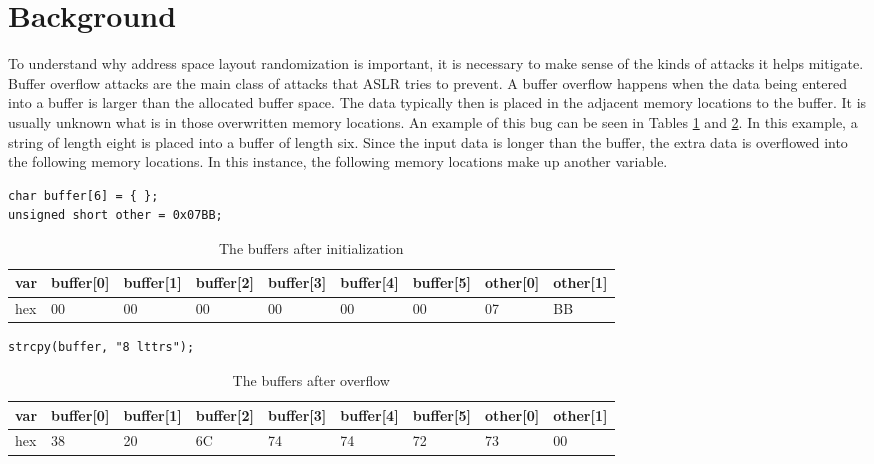 \section{Background}
\label{s:background} %

To understand why address space layout randomization is important, it is necessary to make sense of the kinds of attacks it helps mitigate. Buffer overflow attacks are the main class of attacks that ASLR tries to prevent. A buffer overflow happens when the data being entered into a buffer is larger than the allocated buffer space. The data typically then is placed in the adjacent memory locations to the buffer. It is usually unknown what is in those overwritten memory locations. An example of this bug can be seen in Tables \ref{t:fig1a} and \ref{t:fig1b}. In this example, a string of length eight is placed into a buffer of length six. Since the input data is longer than the buffer, the extra data is overflowed into the following memory locations. In this instance, the following memory locations make up another variable.

\begin{lstlisting}[caption=Code before Table \ref{t:fig1a}]
char buffer[6] = { };
unsigned short other = 0x07BB;
\end{lstlisting}

\begin{table}[h]
\centering %
\begin{tabular}{|l|l|l|l|l|l|l|l|l|}
\hline
\multicolumn{1}{|c|}{var} & buffer{[}0{]} & buffer{[}1{]} & buffer{[}2{]} & buffer{[}3{]} & buffer{[}4{]} & buffer{[}5{]} & other{[}0{]} & other{[}1{]} \\ \hline
hex                       & 00            & 00            & 00            & 00            & 00            & 00            & 07           & BB           \\ \hline
\end{tabular}
\caption{The buffers after initialization}
\label{t:fig1a}
\end{table}

\begin{lstlisting}[caption=Code before Table \ref{t:fig1b}]
strcpy(buffer, "8 lttrs");
\end{lstlisting}

\begin{table}[h]
\centering %
\begin{tabular}{|l|l|l|l|l|l|l|l|l|}
\hline
\multicolumn{1}{|c|}{var} & buffer{[}0{]} & buffer{[}1{]} & buffer{[}2{]} & buffer{[}3{]} & buffer{[}4{]} & buffer{[}5{]} & other{[}0{]} & other{[}1{]} \\ \hline
hex                       & 38            & 20            & 6C            & 74            & 74            & 72            & 73           & 00           \\ \hline
\end{tabular}
\caption{The buffers after overflow}
\label{t:fig1b}
\end{table}

